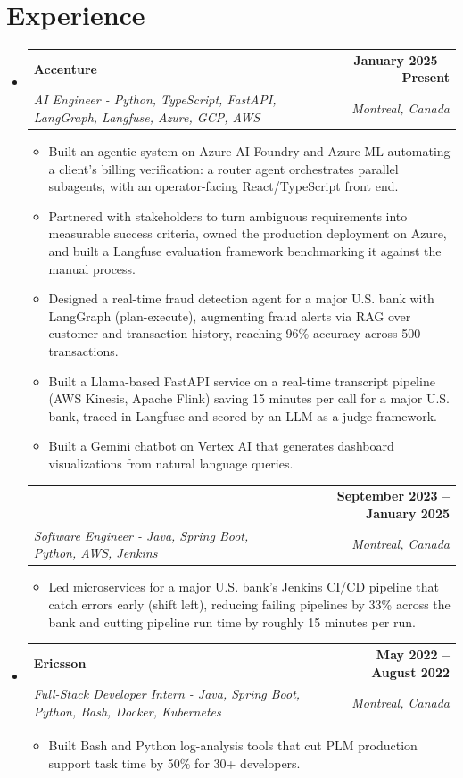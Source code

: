 \documentclass[letterpaper,11pt]{article}
\makeatletter
\newcommand{\resumeItem}[1]{
  \item\small{{#1 \vspace{-2pt}}}
}
\newcommand{\resumeSubheading}[4]{
  \vspace{-2pt}\item
    \begin{tabular*}{1.0\textwidth}[t]{l@{\extracolsep{\fill}}r}
      \textbf{#1} & \textbf{\small #2} \\
      \textit{\small#3} & \textit{\small #4} \\
    \end{tabular*}\vspace{-7pt}
}
\newcommand{\resumeSubheadingContinued}[3]{
  \vspace{4pt}
    \begin{tabular*}{1.0\textwidth}[t]{l@{\extracolsep{\fill}}r}
      & \textbf{\small #2} \\
      \textit{\small#1} & \textit{\small #3} \\
    \end{tabular*}\vspace{-7pt}
}
\newcommand{\resumeSubHeadingListStart}{\begin{itemize}[leftmargin=0.0in, label={}]}
\newcommand{\resumeSubHeadingListEnd}{\end{itemize}}
\newcommand{\resumeItemListStart}{\begin{itemize}}
\newcommand{\resumeItemListEnd}{\end{itemize}\vspace{-5pt}}
\makeatother
\begin{document}
\section{Experience}
  \resumeSubHeadingListStart

    \resumeSubheading
      {Accenture}{January 2025 -- Present}
      {AI Engineer - Python, TypeScript, FastAPI, LangGraph, Langfuse, Azure, GCP, AWS}{Montreal, Canada}
      \resumeItemListStart
        \resumeItem{Built an agentic system on Azure AI Foundry and Azure ML automating a client's billing verification: a router agent orchestrates parallel subagents, with an operator-facing React/TypeScript front end.}
        \resumeItem{Partnered with stakeholders to turn ambiguous requirements into measurable success criteria, owned the production deployment on Azure, and built a Langfuse evaluation framework benchmarking it against the manual process.}
        \resumeItem{Designed a real-time fraud detection agent for a major U.S. bank with LangGraph (plan-execute), augmenting fraud alerts via RAG over customer and transaction history, reaching 96\% accuracy across 500 transactions.}
        \resumeItem{Built a Llama-based FastAPI service on a real-time transcript pipeline (AWS Kinesis, Apache Flink) saving 15 minutes per call for a major U.S. bank, traced in Langfuse and scored by an LLM-as-a-judge framework.}
        \resumeItem{Built a Gemini chatbot on Vertex AI that generates dashboard visualizations from natural language queries.}
      \resumeItemListEnd
      \vspace{-8pt}

    \resumeSubheadingContinued
      {Software Engineer - Java, Spring Boot, Python, AWS, Jenkins}{September 2023 -- January 2025}{Montreal, Canada}
      \resumeItemListStart
        \resumeItem{Led microservices for a major U.S. bank's Jenkins CI/CD pipeline that catch errors early (shift left), reducing failing pipelines by 33\% across the bank and cutting pipeline run time by roughly 15 minutes per run.}
      \resumeItemListEnd

    \resumeSubheading
      {Ericsson}{May 2022 -- August 2022}
      {Full-Stack Developer Intern - Java, Spring Boot, Python, Bash, Docker, Kubernetes}{Montreal, Canada}
      \resumeItemListStart
        \resumeItem{Built Bash and Python log-analysis tools that cut PLM production support task time by 50\% for 30+ developers.}
      \resumeItemListEnd

  \resumeSubHeadingListEnd
\vspace{-14pt}
\end{document}
